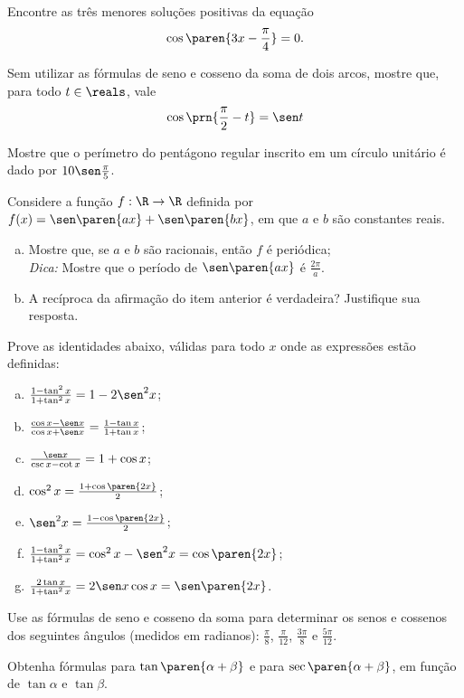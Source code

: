 \begin{exercise}
    Encontre as três menores soluções positivas da equação $$\cos
\paren{3x - \frac {\pi} 4} = 0.$$
\end{exercise}

\begin{exercise}
  Sem utilizar as fórmulas de seno e cosseno da soma de dois arcos,
  mostre que, para todo $t\in\reals$, vale \[\cos\prn{\frac \pi 2-t}=\sen t\]
\end{exercise}

\begin{exercise}
    Mostre que o perímetro do pentágono regular inscrito em um
círculo unitário é dado por $10\sen \frac {\pi} 5$.
\end{exercise}

\begin{exercise}
    Considere a função $f: \R \to \R$ definida por $f(x) = \sen
\paren{ax}+\sen \paren{bx}$, em que $a$ e $b$ são constantes reais.
\begin{enumerate}[(a)]
  \item Mostre que, se $a$ e $b$ são racionais, então $f$ é
  periódica;\\
  \emph{Dica:} Mostre que o período de $\sen \paren{ax}$ é $\frac
  {2\pi} a$.
  \item A recíproca da afirmação do item anterior é verdadeira?
  Justifique sua resposta.
\end{enumerate}
\end{exercise}

\begin{exercise}
    Prove as identidades abaixo, válidas para todo $x$ onde as
expressões estão definidas:
\begin{enumerate}[(a)]
  \item $\frac{1-\tan^2 x}{1+\tan^2 x} = 1 - 2\sen^2 x$;
  \item $\frac{\cos x - \sen x}{\cos x + \sen x} = \frac{1 - \tan x}{1+\tan
  x}$;
  \item $\frac{\sen x}{\csc x - \cot x} = 1+ \cos x$;
  \item $\cos^2 x = \frac {1+\cos \paren{2x}} 2$;
  \item $\sen^2 x = \frac {1-\cos \paren{2x}} 2$;
  \item $\frac{1-\tan^2 x}{1+\tan^2 x} = \cos^2 x - \sen^2 x = \cos \paren{2x}$;
  \item $\frac{2\tan x}{1+\tan^2 x} = 2\sen x \cos x= \sen\paren{2x}$.
\end{enumerate}
\end{exercise}

\begin{exercise}
    Use as fórmulas de seno e cosseno da soma para determinar os
senos e cossenos dos seguintes ângulos (medidos em radianos): $\frac
{\pi} 8$, $\frac{\pi} {12}$, $\frac {3\pi} 8$ e $\frac{5\pi}{12}$.
\end{exercise}

\begin{exercise}
    Obtenha fórmulas para $\tan\paren{\alpha + \beta}$ e para
$\sec\paren{\alpha + \beta}$, em função de $\tan \alpha$ e $\tan
\beta$.
\end{exercise}
